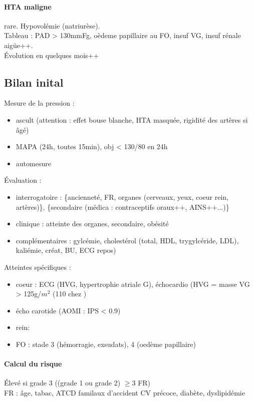 \documentclass{article}
\begin{document}
\paragraph{HTA maligne} rare. Hypovolémie (natriurèse). \\
Tableau : PAD > 130mmFg, oèdeme papillaire au FO, insuf VG, insuf rénale
aigüe++. \\
Évolution en quelques mois++

\subsection{Bilan inital}
Mesure de la pression : 
\begin{itemize}
  \item ascult (attention : effet bouse blanche, HTA masquée, rigidité des
    artères si âgé)
  \item MAPA (24h, toutes 15min), obj < 130/80 en 24h
  \item automesure 
\end{itemize}
Évaluation :
\begin{itemize}
  \item interrogatoire : \{ancienneté, FR, organes (cerveaux, yeux, coeur rein,
    artères)\}, \{secondaire (médica : contraceptifs oraux++, AINS++...)\}
  \item clinique : atteinte des organes, secondaire, obésité
  \item complémentaires : gylcémie, cholestérol (total, HDL, trygylcéride, LDL),
kaliémie, créat, BU, ECG repos)
\end{itemize}
Atteintes spécifiques :
\begin{itemize}
  \item coeur : ECG (HVG, hypertrophie atriale G), échocardio (HVG = masse VG >
    125g/$m^2$ (110 chez \female)
  \item écho carotide (AOMI : IPS < 0.9)
  \item rein: 
  \item FO : stade 3 (hémorragie, exsudats), 4 (oedème papillaire)
\end{itemize}

\paragraph{Calcul du risque}
Élevé si grade 3 \lor{} ((grade 1 ou grade 2) \land{} $\ge 3$ FR)\\
FR : âge, tabac, ATCD familaux d'accident CV précoce, diabète, dyslipidémie
\end{document}
